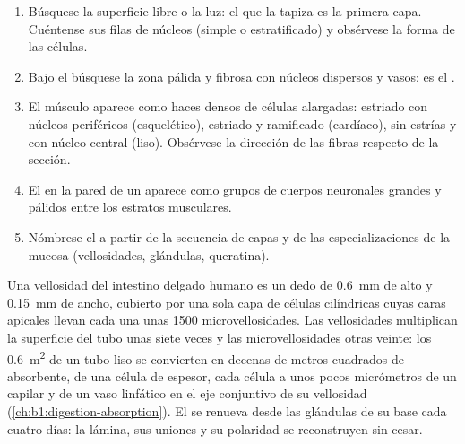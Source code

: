 \begin{method}\label{met:b1:body-plans-tissues:histology}
\begin{enumerate}
  \item Búsquese la superficie libre o la luz: el  que la tapiza es
        la primera capa. Cuéntense sus filas de núcleos (simple o
        estratificado) y obsérvese la forma de las células.
  \item Bajo el  búsquese la zona pálida y fibrosa con núcleos
        dispersos y vasos: es el .
  \item El músculo aparece como haces densos de células alargadas: estriado
        con núcleos periféricos (esquelético), estriado y ramificado
        (cardíaco), sin estrías y con núcleo central (liso). Obsérvese la
        dirección de las fibras respecto de la sección.
  \item El  en la pared de un  aparece como grupos de
        cuerpos neuronales grandes y pálidos entre los estratos musculares.
  \item Nómbrese el  a partir de la secuencia de capas y de las
        especializaciones de la mucosa (vellosidades, glándulas, queratina).
\end{enumerate}
\end{method}

\begin{example}\label{ex:b1:body-plans-tissues:villus}
Una vellosidad del intestino delgado humano es un dedo de \qty{0.6}{mm} de
alto y \qty{0.15}{mm} de ancho, cubierto por una sola capa de células
cilíndricas cuyas caras apicales llevan cada una unas \qty{1500}{}
microvellosidades. Las vellosidades multiplican la superficie del tubo unas
siete veces y las microvellosidades otras veinte: los \qty{0.6}{m^2} de un
tubo liso se convierten en decenas de metros cuadrados de 
absorbente, de una célula de espesor, cada célula a unos pocos micrómetros
de un capilar y de un vaso linfático en el eje conjuntivo de su vellosidad
(\cref{ch:b1:digestion-absorption}). El  se renueva desde las
glándulas de su base cada cuatro días: la lámina, sus uniones y su polaridad
se reconstruyen sin cesar.
\end{example}

